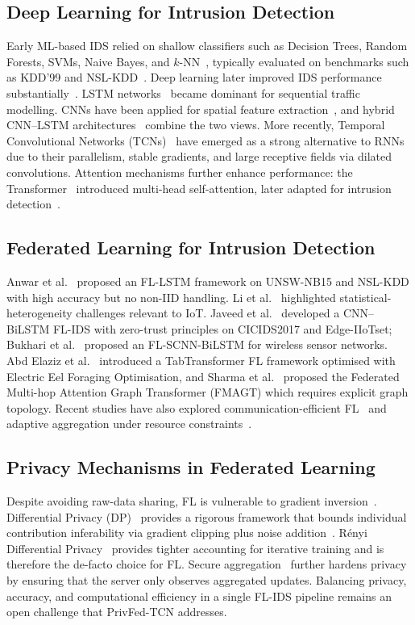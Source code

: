 \documentclass[conference]{IEEEtran}
\begin{document}
\subsection{Deep Learning for Intrusion Detection}
Early ML-based IDS relied on shallow classifiers such as Decision
Trees, Random Forests, SVMs, Naive Bayes, and
$k$-NN~\cite{sommer2010,buczak2015}, typically evaluated on benchmarks
such as KDD'99 and NSL-KDD~\cite{tavallaee2009}. Deep learning later
improved IDS performance substantially~\cite{javaid2016}. LSTM
networks~\cite{hochreiter1997,yin2017} became dominant for sequential
traffic modelling. CNNs have been applied for spatial feature
extraction~\cite{kim2016}, and hybrid CNN--LSTM
architectures~\cite{wang2017} combine the two views. More recently,
Temporal Convolutional Networks (TCNs)~\cite{bai2018} have emerged as
a strong alternative to RNNs due to their parallelism, stable
gradients, and large receptive fields via dilated convolutions.
Attention mechanisms further enhance performance: the
Transformer~\cite{vaswani2017} introduced multi-head self-attention,
later adapted for intrusion detection~\cite{lin2021}.

\subsection{Federated Learning for Intrusion Detection}
Anwar et al.~\cite{anwar2025} proposed an FL-LSTM framework on
UNSW-NB15 and NSL-KDD with high accuracy but no non-IID handling.
Li et al.~\cite{li2020} highlighted statistical-heterogeneity
challenges relevant to IoT. Javeed et al.~\cite{javeed2024} developed
a CNN--BiLSTM FL-IDS with zero-trust principles on CICIDS2017 and
Edge-IIoTset; Bukhari et al.~\cite{bukhari2024} proposed an
FL-SCNN-BiLSTM for wireless sensor networks. Abd Elaziz et
al.~\cite{abdelaziz2025} introduced a TabTransformer FL framework
optimised with Electric Eel Foraging Optimisation, and Sharma et
al.~\cite{sharma2026} proposed the Federated Multi-hop Attention Graph
Transformer (FMAGT) which requires explicit graph topology. Recent
studies have also explored communication-efficient
FL~\cite{konecny2016} and adaptive aggregation under resource
constraints~\cite{wang2020}.

\subsection{Privacy Mechanisms in Federated Learning}
Despite avoiding raw-data sharing, FL is vulnerable to gradient
inversion~\cite{zhu2019}. Differential Privacy (DP)~\cite{dwork2006}
provides a rigorous framework that bounds individual contribution
inferability via gradient clipping plus noise
addition~\cite{geyer2017}. R\'enyi Differential
Privacy~\cite{mironov2017} provides tighter accounting for iterative
training and is therefore the de-facto choice for FL. Secure
aggregation~\cite{bonawitz2017} further hardens privacy by ensuring
that the server only observes aggregated updates. Balancing privacy,
accuracy, and computational efficiency in a single FL-IDS pipeline
remains an open challenge that PrivFed-TCN addresses.
\end{document}
